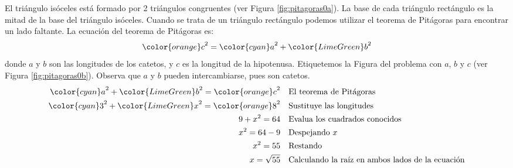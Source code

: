 \begin{solutionbox}{15cm}
\begin{minipage}{0.3\textwidth}
\begin{figure}[H]
        \end{figure}
    \end{minipage}\hfill
    \begin{minipage}{0.65\textwidth}
        El triángulo isóceles está formado por 2 triángulos congruentes (ver Figura \ref{fig:pitagoras0a}).
        La base de cada triángulo rectángulo es la mitad de la base del triángulo isóceles.
        Cuando se trata de un triángulo rectángulo podemos utilizar el teorema de Pitágoras para encontrar un lado faltante.
        La ecuación del teorema de Pitágoras es:
        \[{\color{orange}c}^2={\color{cyan}a}^2+{\color{LimeGreen}b}^2\]
        donde $a$ y $b$ son las longitudes de los catetos, y $c$ es la longitud de la hipotenusa.
        Etiquetemos la Figura del problema con $a$, $b$ y $c$ (ver Figura \ref{fig:pitagoras0b}).
        Observa que $a$ y $b$ pueden intercambiarse, pues son catetos.
        \begin{align*}
            {\color{cyan}a}^2+{\color{LimeGreen}b}^2  ={\color{orange}c}^2 & \text{\quad El teorema de Pitágoras}                          \\
            {\color{cyan}3}^2+{\color{LimeGreen}x}^2  ={\color{orange}8}^2 & \text{\quad Sustituye las longitudes}                         \\
            9+x^2  =64                                                     & \text{\quad Evalua los cuadrados conocidos}                   \\
            x^2=64-9                                                       & \text{\quad Despejando } x                                    \\
            x^2=55                                                         & \text{\quad Restando}                                         \\
            x=\sqrt{55}                                                    & \text{\quad Calculando la raíz en ambos lados de la ecuación} \\
        \end{align*}
    \end{minipage}
\end{solutionbox}
